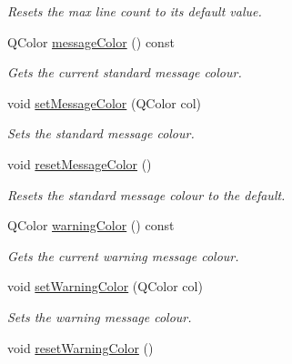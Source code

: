 \begin{DoxyCompactItemize}
\begin{DoxyCompactList}\small\item\em Resets the max line count to its default value. \end{DoxyCompactList}\item 
Q\-Color \hyperlink{class_console_widget_af9dfb729ec2a6973880d717d5b9c1c78}{message\-Color} () const 
\begin{DoxyCompactList}\small\item\em Gets the current standard message colour. \end{DoxyCompactList}\item 
void \hyperlink{class_console_widget_a290f1f7d09a6fb2078cada80d6e8024c}{set\-Message\-Color} (Q\-Color col)
\begin{DoxyCompactList}\small\item\em Sets the standard message colour. \end{DoxyCompactList}\item 
\hypertarget{class_console_widget_a899d2b558ccf3976e45514fd4bd9eb7c}{void \hyperlink{class_console_widget_a899d2b558ccf3976e45514fd4bd9eb7c}{reset\-Message\-Color} ()}\label{class_console_widget_a899d2b558ccf3976e45514fd4bd9eb7c}

\begin{DoxyCompactList}\small\item\em Resets the standard message colour to the default. \end{DoxyCompactList}\item 
Q\-Color \hyperlink{class_console_widget_af1abcb3bb2a6be074233e1891ecace91}{warning\-Color} () const 
\begin{DoxyCompactList}\small\item\em Gets the current warning message colour. \end{DoxyCompactList}\item 
void \hyperlink{class_console_widget_aaf8789dc58ae736b951552b1fb9cef0d}{set\-Warning\-Color} (Q\-Color col)
\begin{DoxyCompactList}\small\item\em Sets the warning message colour. \end{DoxyCompactList}\item 
\hypertarget{class_console_widget_af089740931bec97455b7858afc0d291c}{void \hyperlink{class_console_widget_af089740931bec97455b7858afc0d291c}{reset\-Warning\-Color} ()}\label{class_console_widget_af089740931bec97455b7858afc0d291c}


\end{DoxyCompactItemize}
